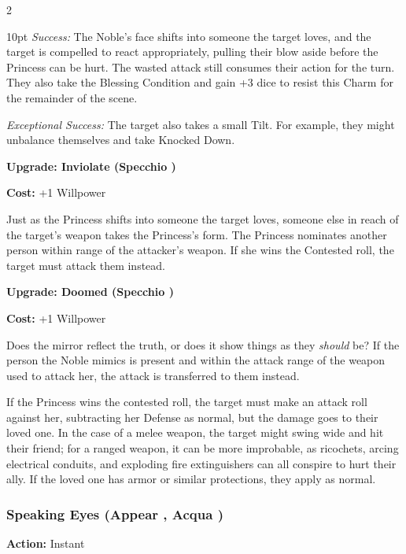 \begin{multicols}{2}
\begin{myindentpar}{10pt}
    \emph{Success:} The Noble's face shifts into someone the target loves, and the target is compelled to react appropriately, pulling their blow aside before the Princess can be hurt. The wasted attack still consumes their action for the turn. They also take the Blessing Condition and gain +3 dice to resist this Charm for the remainder of the scene. 

    \emph{Exceptional Success:} The target also takes a small Tilt. For example, they might unbalance themselves and take Knocked Down.  

\textbf{Upgrade: Inviolate (Specchio \textbullet\textbullet\textbullet)}

\noindent \textbf{Cost:} +1 Willpower

Just as the Princess shifts into someone the target loves, someone else in reach of the target's weapon takes the Princess's form. The Princess nominates another person within range of the attacker's weapon. If she wins the Contested roll, the target must attack them instead. 

\textbf{Upgrade: Doomed (Specchio \textbullet\textbullet\textbullet\textbullet)}

\noindent \textbf{Cost:} +1 Willpower

Does the mirror reflect the truth, or does it show things as they \textit{should} be? If the person the Noble mimics is present and within the attack range of the weapon used to attack her, the attack is transferred to them instead. 

If the Princess wins the contested roll, the target must make an attack roll against her, subtracting her Defense as normal, but the damage goes to their loved one. In the case of a melee weapon, the target might swing wide and hit their friend; for a ranged weapon, it can be more improbable, as ricochets, arcing electrical conduits, and exploding fire extinguishers can all conspire to hurt their ally. If the loved one has armor or similar protections, they apply as normal. \end{myindentpar}

\subsubsection*{Speaking Eyes (Appear \textbullet\textbullet, Acqua \textbullet)}
\noindent \textbf{Action:} Instant


\end{multicols}
